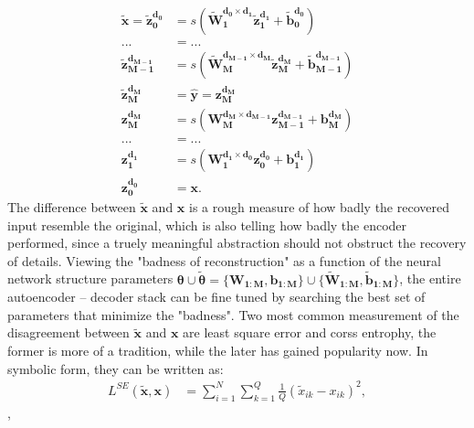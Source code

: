 \begin{equation} \label{eq:SDA}
\begin{split}
  \boldsymbol{\tilde{x}}=
  \boldsymbol{\tilde{z}_{0  }^{d_{0  }}} &= s(\boldsymbol{\tilde{W}_{1  }^{d_{0  } \times d_{1  }} \tilde{z}_{1  }^{d_{1  }}}+\boldsymbol{\tilde{b}_{0  }^{d_{0  }}}) \\
  ... &= ... \\
  \boldsymbol{\tilde{z}_{M-1}^{d_{M-1}}} &= s(\boldsymbol{\tilde{W}_{M  }^{d_{M-1} \times d_{M  }} \tilde{z}_{M  }^{d_{M  }}}+\boldsymbol{\tilde{b}_{M-1}^{d_{M-1}}}) \\
  \boldsymbol{\tilde{z}_{M  }^{d_{M  }}} &= \boldsymbol{\hat{y}} = \boldsymbol{z_{M  }^{d_{M  }}} \\
  \boldsymbol{z_{M  }^{d_{M  }}}         &= s(\boldsymbol{W_{M  }^{d_{M  } \times d_{M-1}} z_{M-1}^{d_{M-1}}}+\boldsymbol{b_{M  }^{d_{M  }}}) \\
  ... &= ... \\
  \boldsymbol{z_{1  }^{d_{1  }}}         &= s(\boldsymbol{W_{1  }^{d_{1  } \times d_{0  }} z_{0  }^{d_{0  }}}+\boldsymbol{b_{1  }^{d_{1  }}}) \\
  \boldsymbol{z_{0  }^{d_{0  }}}         &= \boldsymbol{x}.
\end{split}
\end{equation}
The difference between $\boldsymbol{\tilde{x}}$ and $\boldsymbol{x}$ is a rough measure of how badly the recovered input resemble the original, which is also telling how badly the encoder performed, since a truely meaningful abstraction should not obstruct the recovery of details. Viewing the "badness of reconstruction" as a function of the neural network structure parameters $\boldsymbol{\theta} \cup \boldsymbol{\tilde{\theta}}=\{\boldsymbol{W_{1:M}},\boldsymbol{b_{1:M}}\} \cup \{\boldsymbol{\tilde{W}_{1:M}}, \boldsymbol{\tilde{b}_{1:M}}\}$, the entire autoencoder -- decoder stack can be fine tuned by searching the best set of parameters that minimize the "badness". Two most common measurement of the disagreement between $\boldsymbol{\tilde{x}}$ and $\boldsymbol{x}$ are least square error and corss entrophy, the former is more of a tradition, while the later has gained popularity now. In symbolic form, they can be written as:
\begin{equation} \label{eq:SE}
\begin{split}
  L^{SE}(\boldsymbol{\tilde{x}},\boldsymbol{x}) &= \sum_{i=1}^N\sum_{k=1}^Q\frac{1}{Q}(\tilde{x}_{ik}-x_{ik})^2,
\end{split}
\end{equation},

